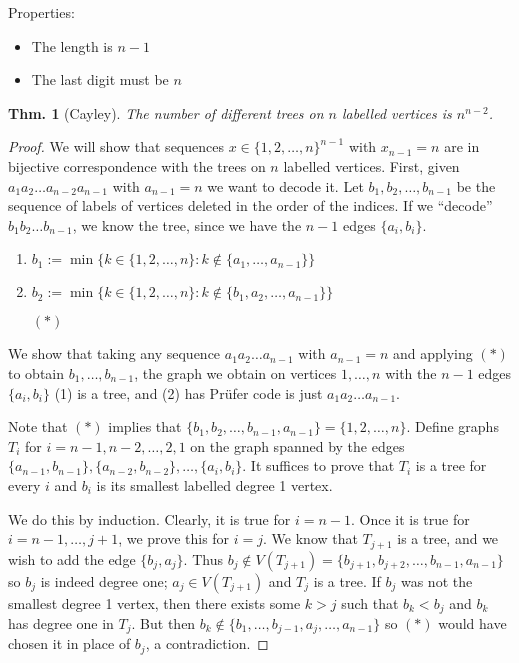 \documentclass[12pt, a4paper]{book}
\newtheorem{theorem}{Thm.}[section]
\theoremstyle{nonumberplain}
\newtheorem{proof}{Proof}
\begin{document}
Properties:
\begin{itemize}[nolistsep]
    \item The length is $n-1$
    \item The last digit must be $n$
\end{itemize}
\begin{theorem}[Cayley]
    The number of different trees on $n$ labelled vertices is $n^{n-2}$.
\end{theorem}
\begin{proof}
    We will show that sequences $x\in\{1,2,\ldots,n\}^{n-1}$ with $x_{n-1}=n$ are in bijective correspondence with the trees on $n$ labelled vertices.
    First, given $a_1a_2\ldots a_{n-2}a_{n-1}$ with $a_{n-1}=n$ we want to decode it.
    Let $b_1,b_2,\ldots,b_{n-1}$ be the sequence of labels of vertices deleted in the order of the indices.
    If we ``decode'' $b_1b_2\ldots b_{n-1}$, we know the tree, since we have the $n-1$ edges $\{a_i,b_i\}$.
    \begin{enumerate}
        \item $b_1:=\min\{k\in\{1,2,\ldots,n\}:k\notin \{a_1,\ldots,a_{n-1}\}\}$
        \item $b_2:=\min\{k\in\{1,2,\ldots,n\}:k\notin \{b_1,a_2,\ldots,a_{n-1}\}\}$
        \item[$(*)$] 
    \end{enumerate}
    We show that taking any sequence $a_1a_2\ldots a_{n-1}$ with $a_{n-1}=n$ and applying $(*)$ to obtain $b_1,\ldots,b_{n-1}$, the graph we obtain on vertices $1,\ldots,n$ with the $n-1$ edges $\{a_i,b_i\}$ (1) is a tree, and (2) has Pr\"ufer code is just $a_1a_2\ldots a_{n-1}$.

    Note that $(*)$ implies that $\{b_1,b_2,\ldots,b_{n-1},a_{n-1}\}=\{1,2,\ldots,n\}$.
    Define graphs $T_i$ for $i=n-1,n-2,\ldots,2,1$ on the graph spanned by the edges $\{a_{n-1},b_{n-1}\},\{a_{n-2},b_{n-2}\},\ldots,\{a_i,b_i\}$.
    It suffices to prove that $T_i$ is a tree for every $i$ and $b_i$ is its smallest labelled degree 1 vertex.

    We do this by induction.
    Clearly, it is true for $i=n-1$.
    Once it is true for $i=n-1,\ldots,j+1$, we prove this for $i=j$.
    We know that $T_{j+1}$ is a tree, and we wish to add the edge $\{b_j,a_j\}$.
    Thus $b_j\notin V(T_{j+1})=\{b_{j+1},b_{j+2},\ldots,b_{n-1},a_{n-1}\}$ so $b_j$ is indeed degree one; $a_j\in V(T_{j+1})$ and $T_j$ is a tree.
    If $b_j$ was not the smallest degree 1 vertex, then there exists some $k>j$ such that $b_k<b_j$ and $b_k$ has degree one in $T_j$.
    But then $b_k\notin\{b_1,\ldots,b_{j-1},a_j,\ldots,a_{n-1}\}$ so $(*)$ would have chosen it in place of $b_j$, a contradiction.

\end{proof}
\end{document}
